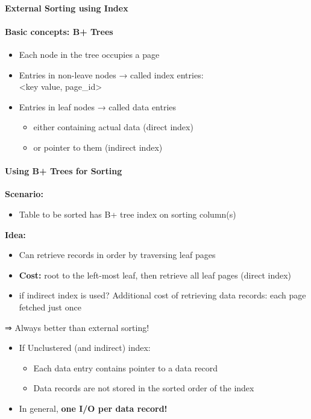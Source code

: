 \paragraph{External Sorting using Index}

\paragraph{Basic concepts: B+ Trees}
\begin{itemize}
\item Each node in the tree occupies a page
\item Entries in non-leave nodes → called index entries: \\
  {\color{red} <key value, page\_id>}
\item Entries in leaf nodes → called data entries
  \begin{itemize}
  \item either containing actual data (direct index)
  \item or pointer to them (indirect index)
  \end{itemize}
\end{itemize}

\paragraph{Using B+ Trees for Sorting}

\textbf{Scenario:}
\begin{itemize}
\item Table to be sorted has B+ tree index on sorting column(s)
\end{itemize}

\textbf{Idea:}
\begin{itemize}
\item Can retrieve records in order by traversing leaf pages
\end{itemize}

\begin{itemize}
\item \textbf{Cost:} root to the left-most leaf, then retrieve all
  leaf pages (direct index)
\item if indirect index is used? Additional cost of retrieving
  data records: each page fetched just once
\end{itemize}

⇒ Always better than external sorting!


\begin{itemize}
\item If Unclustered (and indirect) index:
  \begin{itemize}
  \item Each data entry contains pointer to a data record
  \item Data records are not stored in the sorted order of the index
  \end{itemize}

\item In general, \textbf{one I/O per data record!}
\end{itemize}


